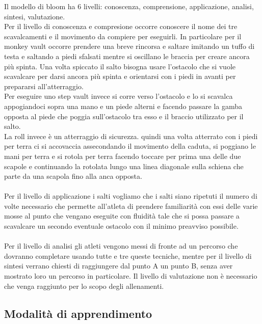Il modello di bloom ha 6 livelli: conoscenza, comprensione, applicazione, analisi, sintesi, valutazione.\\
Per il livello di conoscenza e compresione occorre conoscere il nome dei tre scavalcamenti e il movimento da compiere per eseguirli. In particolare per il monkey vault occorre prendere una breve rincorsa e saltare imitando un tuffo di testa e saltando a piedi sfalsati mentre si oscillano le braccia per creare ancora più spinta. Una volta spiccato il salto bisogna usare l'ostacolo che si vuole scavalcare per darsi ancora più spinta e orientarsi con i piedi in avanti per prepararsi all'atterraggio.\\
Per eseguire uno step vault invece si corre verso l'ostacolo e lo si scavalca appogiandoci sopra una mano e un piede alterni e facendo passare la gamba opposta al piede che poggia sull'ostacolo tra esso e il braccio utilizzato per il salto.\\
La roll invece è un atterraggio di sicurezza. quindi una volta atterrato con i piedi per terra ci si accovaccia assecondando il movimento della caduta, si poggiano le mani per terra e si rotola per terra facendo toccare per prima una delle due scapole e continuando la rotolata lungo una linea diagonale sulla schiena che parte da una scapola fino alla anca opposta.\\
\\
Per il livello di applicazione i salti vogliamo che i salti siano ripetuti il numero di volte necessario che permette all'atleta di prendere familiarità con essi delle varie mosse al punto che vengano eseguite con fluidità tale che si possa passare a scavalcare un secondo eventuale ostacolo con il minimo preavviso possibile.\\
\\
Per il livello di analisi gli atleti vengono messi di fronte ad un percorso che dovranno completare usando tutte e tre queste tecniche, mentre per il livello di sintesi verrano chiesti di raggiungere dal punto A un punto B, senza aver mostrato loro un percorso in particolare.
Il livello di valutazione non è necessario che venga raggiunto per lo scopo degli allenamenti.

\subsection{Modalità di apprendimento}

